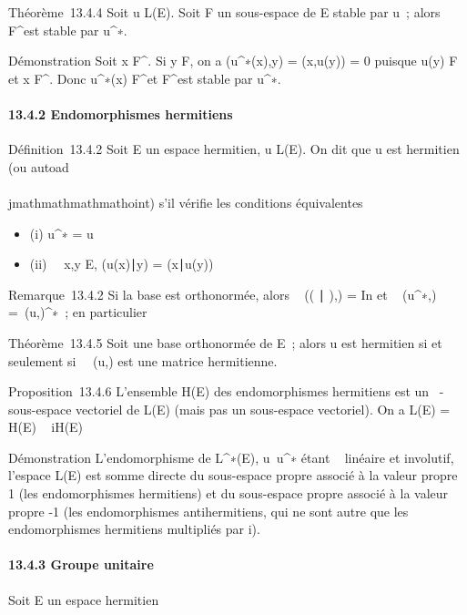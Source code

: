 Théorème~13.4.4 Soit u \in L(E). Soit F un sous-espace de E stable par u~;
alors F^\bot est stable par u^∗.

Démonstration Soit x \in F^\bot. Si y \in F, on a
\phi(u^∗(x),y) = \phi(x,u(y)) = 0 puisque u(y) \in F et x \in
F^\bot. Donc u^∗(x) \in F^\bot et
F^\bot est stable par u^∗.

\paragraph{13.4.2 Endomorphismes hermitiens}

Définition~13.4.2 Soit E un espace hermitien, u \in L(E). On dit que u est
hermitien (ou autoad\\\\jmathmathmathmathoint) s'il vérifie les conditions équivalentes

\begin{itemize}
\itemsep1pt\parskip0pt
\item
  (i) u^∗ = u
\item
  (ii) \forall~~x,y \in E,
  (u(x)∣y) =
  (x∣u(y))
\end{itemize}

Remarque~13.4.2 Si la base  est orthonormée, alors
\mathrmMat~ ((
∣ ),) = In et
\mathrmMat~
(u^∗,) =\
\mathrmMat (u,)^∗~; en particulier

Théorème~13.4.5 Soit  une base orthonormée de E~; alors u est hermitien
si et seulement
si~\mathrmMat~ (u,) est une
matrice hermitienne.

Proposition~13.4.6 L'ensemble H(E) des endomorphismes hermitiens est un
\mathbb{R}~-sous-espace vectoriel de L(E) (mais pas un \mathbb{C} sous-espace vectoriel).
On a L(E) = H(E) \oplus~ iH(E)

Démonstration L'endomorphisme de L^∗(E),
u\mapsto~u^∗ étant ~ linéaire et
involutif, l'espace L(E) est somme directe du sous-espace propre associé
à la valeur propre 1 (les endomorphismes hermitiens) et du sous-espace
propre associé à la valeur propre -1 (les endomorphismes antihermitiens,
qui ne sont autre que les endomorphismes hermitiens multipliés par i).

\paragraph{13.4.3 Groupe unitaire}

Soit E un espace hermitien

